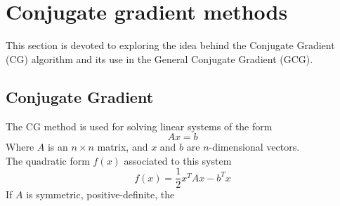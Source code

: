 \section{Conjugate gradient methods}
This section is devoted to exploring the idea behind the Conjugate Gradient (CG) algorithm and its use in the General Conjugate Gradient (GCG).
\subsection{Conjugate Gradient}
The CG method is used for solving linear systems of the form
\begin{equation}
    \label{eq:lin_sys}
    Ax = b
\end{equation}
Where $A$ is an $n\times n$ matrix, and $x$ and $b$ are $n$-dimensional vectors.
\\The quadratic form $f(x)$ associated to this system  
\begin{equation}
    \label{eq:quad_form}
    f(x) = \frac 1 2 x^T A x - b^T x
\end{equation}
If $A$ is symmetric, positive-definite, the 


